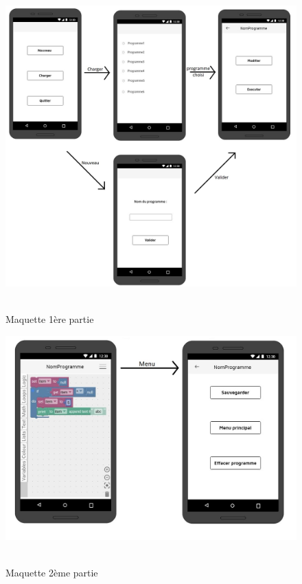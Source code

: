 \documentclass[12pt,francais]{report}
\begin{document}
\begin{figure}[!h]
\begin{addmargin}[-7em]{1em}
\includegraphics[scale=0.45]{./images/maquette1.jpg}~\\[1.5cm]
\caption{Maquette 1ère partie}
\end{addmargin}
\end{figure}

\begin{figure}[!h]
\begin{addmargin}[-5em]{1em}
\includegraphics[scale=0.6]{./images/maquette2.jpg}~\\[1.5cm]
\caption{Maquette 2ème partie}
\label{figMaquette}
\end{addmargin}
\end{figure}
\end{document}
